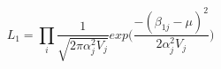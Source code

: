 \begin{equation}
\label{mle}
L_1 = \prod\limits_i\frac{1}{\sqrt{2\pi \alpha_j^2 V_j}}exp\Big(\frac{-(\beta_{1j}- \mu)^2}{2 \alpha_j^2 V_j}\Big)
\end{equation}




